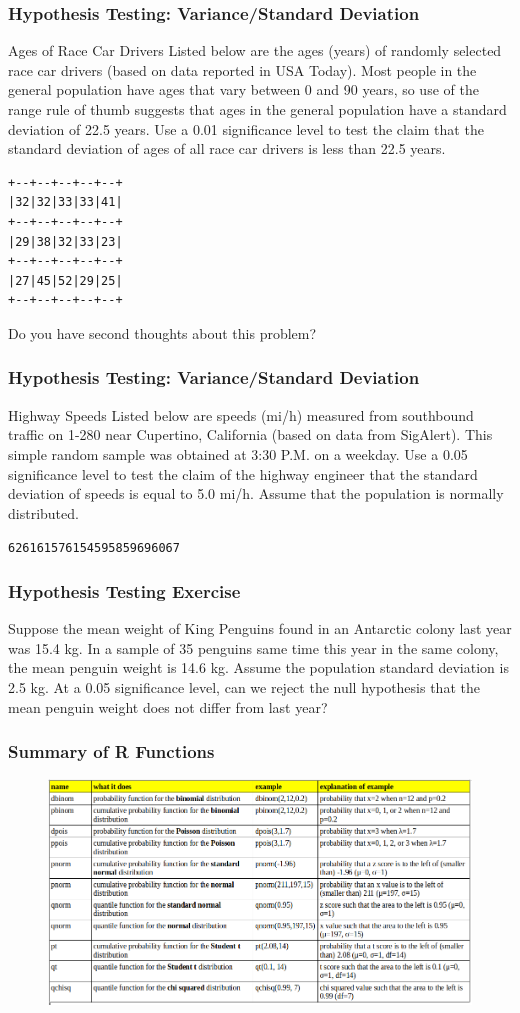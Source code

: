 \documentclass[xcolor=dvipsnames]{beamer}
\begin{document}
\begin{frame}[fragile]
  \frametitle{Hypothesis Testing:
    Variance/Standard Deviation}
{\ubung} Ages of Race Car Drivers Listed below are the ages (years) of
randomly selected race car drivers (based on data reported in USA
Today). Most people in the general population have ages that vary
between 0 and 90 years, so use of the range rule of thumb suggests
that ages in the general population have a standard deviation of
22.5 years. Use a 0.01 significance level to test the claim that
the standard deviation of ages of all race car drivers is less
than 22.5 years. 
\begin{verbatim}
+--+--+--+--+--+
|32|32|33|33|41|
+--+--+--+--+--+
|29|38|32|33|23|
+--+--+--+--+--+
|27|45|52|29|25|
+--+--+--+--+--+
\end{verbatim}
Do you have second thoughts about
this problem?
\end{frame}

\begin{frame}[fragile]
  \frametitle{Hypothesis Testing: Variance/Standard Deviation}
  {\ubung} Highway Speeds Listed below are speeds (mi/h) measured
  from southbound traffic on 1-280 near Cupertino, California
  (based on data from SigAlert). This simple random sample was
  obtained at 3:30 P.M. on a weekday. Use a 0.05 significance
  level to test the claim of the highway engineer that the
  standard deviation of speeds is equal to 5.0 mi/h. Assume that
  the population is normally distributed.
\begin{alltt}
62 61 61 57 61 54 59 58 59 69 60 67
\end{alltt}
\end{frame}

\begin{frame}
  \frametitle{Hypothesis Testing Exercise}
  {\ubung} Suppose the mean weight of King Penguins found in an
  Antarctic colony last year was 15.4 kg. In a sample of 35 penguins
  same time this year in the same colony, the mean penguin weight is
  14.6 kg. Assume the population standard deviation is 2.5 kg. At a
  0.05 significance level, can we reject the null hypothesis that the
  mean penguin weight does not differ from last year?
\end{frame}

\begin{frame}
  \frametitle{Summary of R Functions}
    \begin{figure}[h]
    \includegraphics[scale=0.32]{./diagrams/rfunctions.png}
  \end{figure}
\end{frame}
\end{document}
